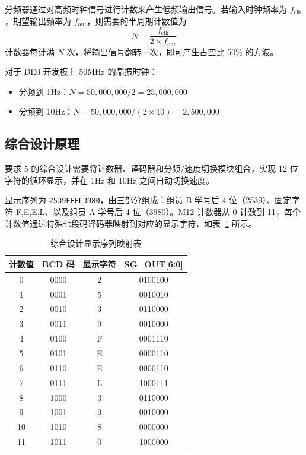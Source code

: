 \documentclass{ctexrep}
\begin{document}
分频器通过对高频时钟信号进行计数来产生低频输出信号。若输入时钟频率为 $f_{\text{clk}}$，期望输出频率为 $f_{\text{out}}$，则需要的半周期计数值为
\[
    N = \frac{f_{\text{clk}}}{2 \times f_{\text{out}}}
\]
计数器每计满 $N$ 次，将输出信号翻转一次，即可产生占空比 50\% 的方波。

对于 DE0 开发板上 50MHz 的晶振时钟：
\begin{itemize}
    \item 分频到 1Hz：$N = 50{,}000{,}000 / 2 = 25{,}000{,}000$
    \item 分频到 10Hz：$N = 50{,}000{,}000 / (2 \times 10) = 2{,}500{,}000$
\end{itemize}

\subsection{综合设计原理}

要求 5 的综合设计需要将计数器、译码器和分频/速度切换模块组合，实现 12 位字符的循环显示，并在 1Hz 和 10Hz 之间自动切换速度。

显示序列为 \texttt{2539FEEL3980}，由三部分组成：组员 B 学号后 4 位（2539）、固定字符 F,E,E,L、以及组员 A 学号后 4 位（3980）。M12 计数器从 0 计数到 11，每个计数值通过特殊七段码译码器映射到对应的显示字符，如表~\ref{e4:tab:display_map} 所示。

\begin{table}[H]
    \centering
    \caption{综合设计显示序列映射表}
    \label{e4:tab:display_map}
    \begin{tabular}{cccc}
        \toprule
        \textbf{计数值} & \textbf{BCD 码} & \textbf{显示字符} & \textbf{SG\_OUT[6:0]} \\
        \midrule
        0  & 0000 & 2 & 0100100 \\
        1  & 0001 & 5 & 0010010 \\
        2  & 0010 & 3 & 0110000 \\
        3  & 0011 & 9 & 0010000 \\
        4  & 0100 & F & 0001110 \\
        5  & 0101 & E & 0000110 \\
        6  & 0110 & E & 0000110 \\
        7  & 0111 & L & 1000111 \\
        8  & 1000 & 3 & 0110000 \\
        9  & 1001 & 9 & 0010000 \\
        10 & 1010 & 8 & 0000000 \\
        11 & 1011 & 0 & 1000000 \\
        \bottomrule
    \end{tabular}
\end{table}
\end{document}
